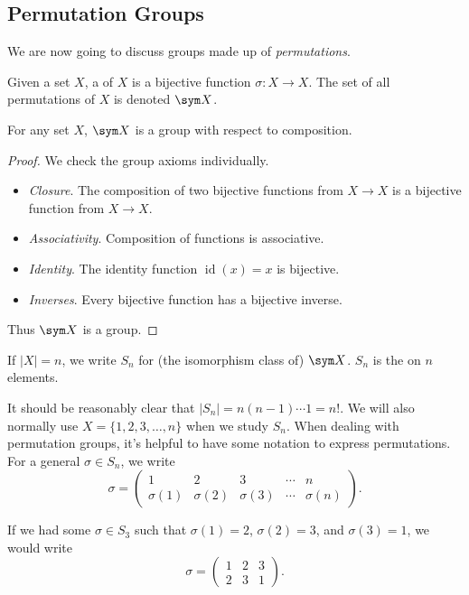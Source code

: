 \documentclass[a4paper]{scrartcl}
\newcommand{\newsection}{\subsection}
\begin{document}
\newsection{Permutation Groups}

We are now going to discuss groups made up of \emph{permutations}.

\begin{definition}[Permutations]
	Given a set $X$, a  of $X$ is a bijective function $\sigma: X \rightarrow X$. The set of all permutations of $X$ is denoted $\sym X$.
\end{definition}

\begin{theorem}
	For any set $X$, $\sym X$ is a group with respect to composition. 
\end{theorem}
\begin{proof}
	We check the group axioms individually.
	\begin{itemize}
		\item \emph{Closure}. The composition of two bijective functions from $X \rightarrow X$ is a bijective function from $X \rightarrow X$.
		\item \emph{Associativity}. Composition of functions is associative.
		\item \emph{Identity}. The identity function $\operatorname{id}(x) = x$ is bijective.
		\item \emph{Inverses}. Every bijective function has a bijective inverse.
	\end{itemize}
	Thus $\sym X$ is a group.
\end{proof}

\begin{definition}
	If $|X| = n$, we write $S_n$ for (the isomorphism class of) $\sym X$. $S_n$ is the  on $n$ elements.
\end{definition}

It should be reasonably clear that $|S_n| = n(n - 1) \cdots 1 = n!$. We will also normally use $X = \{1, 2, 3, \dots, n \}$ when we study $S_n$. When dealing with permutation groups, it's helpful to have some notation to express permutations. For a general $\sigma \in S_n$, we write
$$
\sigma = \begin{pmatrix}
	1 & 2 & 3 & \cdots & n \\
	\sigma(1) & \sigma(2) & \sigma(3) & \cdots & \sigma(n)
\end{pmatrix}.
$$

\begin{example}
	If we had some $\sigma \in S_3$ such that $\sigma(1) = 2$, $\sigma(2) = 3$, and $\sigma(3) = 1$, we would write
	$$
\sigma = \begin{pmatrix}
	1 & 2 & 3 \\
	2 & 3 & 1
\end{pmatrix}.
$$
\end{example}
\end{document}
